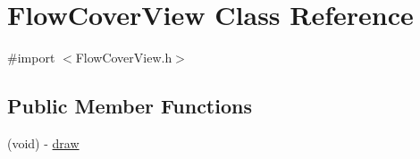 \hypertarget{interface_flow_cover_view}{
\section{FlowCoverView Class Reference}
\label{interface_flow_cover_view}
}


{\ttfamily \#import $<$FlowCoverView.h$>$}

\subsection*{Public Member Functions}
\begin{DoxyCompactItemize}
\item 
(void) -\/ \hyperlink{interface_flow_cover_view_a56c5cf8a568cff737ff95520cbe6b405}{draw}
\end{DoxyCompactItemize}
